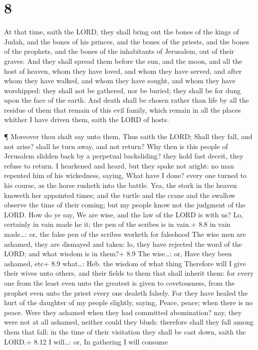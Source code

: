 \hypertarget{section-7}{%
\section{8}\label{section-7}}

 At that time, saith the LORD, they shall bring out the
bones of the kings of Judah, and the bones of his princes, and the bones
of the priests, and the bones of the prophets, and the bones of the
inhabitants of Jerusalem, out of their graves:  And they
shall spread them before the sun, and the moon, and all the host of
heaven, whom they have loved, and whom they have served, and after whom
they have walked, and whom they have sought, and whom they have
worshipped: they shall not be gathered, nor be buried; they shall be for
dung upon the face of the earth.  And death shall be chosen
rather than life by all the residue of them that remain of this evil
family, which remain in all the places whither I have driven them, saith
the LORD of hosts.

 ¶ Moreover thou shalt say unto them, Thus saith the LORD;
Shall they fall, and not arise? shall he turn away, and not return?
 Why then is this people of Jerusalem slidden back by a
perpetual backsliding? they hold fast deceit, they refuse to return.
 I hearkened and heard, but they spake not aright: no man
repented him of his wickedness, saying, What have I done? every one
turned to his course, as the horse rusheth into the battle. 
Yea, the stork in the heaven knoweth her appointed times; and the turtle
and the crane and the swallow observe the time of their coming; but my
people know not the judgment of the LORD.  How do ye say, We
are wise, and the law of the LORD is with us? Lo, certainly in vain made
he it; the pen of the scribes is in vain.+ 8.8 in vain made\ldots: or,
the false pen of the scribes worketh for falsehood  The wise
men are ashamed, they are dismayed and taken: lo, they have rejected the
word of the LORD; and what wisdom is in them?+ 8.9 The wise\ldots: or,
Have they been ashamed, etc+ 8.9 what\ldots: Heb. the wisdom of what
thing  Therefore will I give their wives unto others, and
their fields to them that shall inherit them: for every one from the
least even unto the greatest is given to covetousness, from the prophet
even unto the priest every one dealeth falsely.  For they
have healed the hurt of the daughter of my people slightly, saying,
Peace, peace; when there is no peace.  Were they ashamed
when they had committed abomination? nay, they were not at all ashamed,
neither could they blush: therefore shall they fall among them that
fall: in the time of their visitation they shall be cast down, saith the
LORD.+ 8.12 I will\ldots: or, In gathering I will consume

